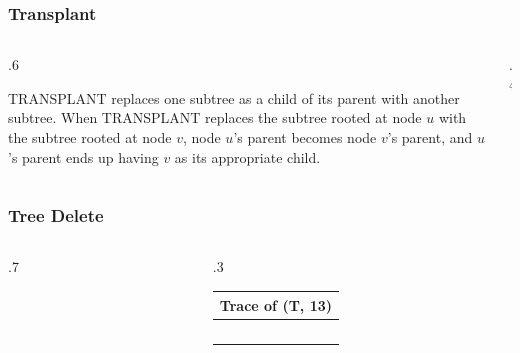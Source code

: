 \documentclass[10pt]{beamer}
\begin{document}
\begin{frame}[t]\frametitle{Transplant}
	\begin{columns}[T] %
	\begin{column}{.6\linewidth} %
		{\scriptsize
			
		} %

		{ \scriptsize
		TRANSPLANT replaces one subtree as a child of its parent with another subtree. 
		When TRANSPLANT replaces the subtree rooted at node $u$ 
		with the subtree rooted at node $v$, 
		node $u$’s parent becomes node $v$’s parent, and $u$’s parent ends up 
		having $v$ as its appropriate child.
		} %

	\end{column} %
	\begin{column}{.4\linewidth} %

		{\tiny 
		
		} %

	\end{column} %
	\end{columns} %
	
\end{frame}




\begin{frame}[t]\frametitle{Tree Delete}
	\begin{columns}[T] %
	\begin{column}{.7\linewidth} %
		{\scriptsize
			
		} %

	\end{column} %
	\begin{column}{.3\linewidth} %

		{\small 
		
		} %
	
		{\footnotesize 
			\begin{tabular}{| l |}
			\hline
			Trace of {\scriptsize \TreeDelete(T, 13)}\\
			\hline
			~\\
			\hline
			\end{tabular}
		} %

	\end{column} %
	\end{columns} %
	
\end{frame}
\end{document}
